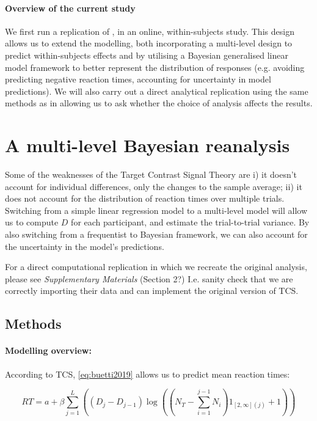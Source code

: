 \documentclass[smallextended]{svjour3}       %
\begin{document}
\paragraph{Overview of the current study}
We first run a replication of \cite{buetti2019predicting}, in an online, within-subjects study. This design allows us to extend the modelling, both incorporating a multi-level design to predict within-subjects effects and by utilising a Bayesian generalised linear model framework to better represent the distribution of responses (e.g. avoiding predicting negative reaction times, accounting for uncertainty in model predictions). We will also carry out a direct analytical replication using the same methods as in \cite{buetti2019predicting} allowing us to ask whether the choice of analysis affects the results.

\section{A multi-level Bayesian reanalysis}
\label{sec:reanalysis}

Some of the weaknesses of the Target Contrast Signal Theory are i) it doesn't account for individual differences, only the changes to the sample average;  ii) it does not account for the distribution of reaction times over multiple trials. Switching from a simple linear regression model to a multi-level model will allow us to compute $D$ for each participant, and estimate the trial-to-trial variance. By also switching from a frequentist to Bayesian framework, we can also account for the uncertainty in the model's predictions. 

For a direct computational replication in which we recreate the original analysis, please see \textit{Supplementary Materials} (Section 2?) I.e. sanity check that we are correctly importing their data and can implement the original version of TCS.

\subsection{Methods}

\paragraph{Modelling overview:} According to TCS, \ref{eq:buetti2019} allows us to predict mean reaction times:

\begin{equation}
RT = a + \beta\sum_{j=1}^L\left((D_j - D_{j-1})\log\left(\left(N_T - \sum_{i=1}^{j-1}N_i\right)1_{[2,\infty](j)}+1 \right)\right)
\label{eq:buetti2019}
\end{equation}
\end{document}
